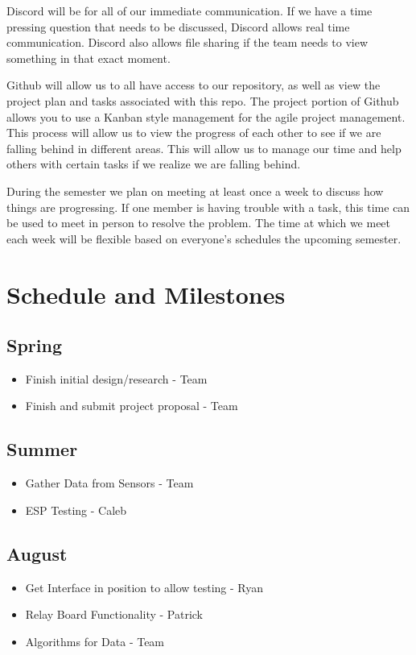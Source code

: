 \documentclass[letterpaper, 10 pt, conference]{ieeeconf}  %
\begin{document}
Discord will be for all of our immediate communication. If we have a time pressing question that needs to be discussed, Discord allows real time communication. Discord also allows file sharing if the team needs to view something in that exact moment. 

Github will allow us to all have access to our repository, as well as view the project plan and tasks associated with this repo. The project portion of Github allows you to use a Kanban style management for the agile project management. This process will allow us to view the progress of each other to see if we are falling behind in different areas. This will allow us to manage our time and help others with certain tasks if we realize we are falling behind. 

During the semester we plan on meeting at least once a week to discuss how things are progressing. If one member is having trouble with a task, this time can be used to meet in person to resolve the problem. The time at which we meet each week will be flexible based on everyone's schedules the upcoming semester.

\section{Schedule and Milestones}
\subsection{Spring}
\begin{itemize}
  \item Finish initial design/research - Team
  \item Finish and submit project proposal - Team
\end{itemize}

\subsection{Summer}
\begin{itemize}
  \item Gather Data from Sensors - Team
  \item ESP Testing - Caleb
\end{itemize}


\subsection{August}
\begin{itemize}
  \item Get Interface in position to allow testing - Ryan
  \item Relay Board Functionality - Patrick
  \item Algorithms for Data - Team
\end{itemize}
\end{document}
